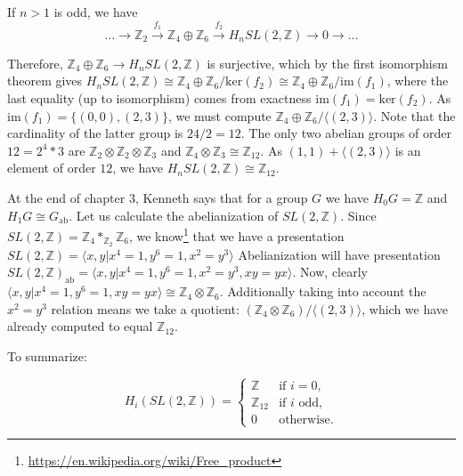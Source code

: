 \documentclass{article}
\begin{document}
\noindent
If $n>1$ is odd, we have
\begin{equation*}
\dots \to \mathbb{Z}_2 \xrightarrow{f_1} \mathbb{Z}_4 \oplus \mathbb{Z}_6 \xrightarrow{f_2} H_n SL(2,\mathbb{Z}) \to 0 \to \dots
\end{equation*}

Therefore, $\mathbb{Z}_4 \oplus \mathbb{Z}_6 \to H_n SL(2, \mathbb{Z})$ is surjective, which by the first isomorphism theorem gives 
$H_n SL(2, \mathbb{Z}) \cong \mathbb{Z}_4 \oplus \mathbb{Z}_6 / \mathrm{ker}(f_2) \cong \mathbb{Z}_4 \oplus \mathbb{Z}_6 / \mathrm{im}(f_1)$, where the last equality (up to isomorphism) comes from exactness $\mathrm{im}(f_1) = \mathrm{ker}(f_2)$.
As $\mathrm{im}(f_1) = \{(0,0),(2,3) \}$, we must compute  $\mathbb{Z}_4 \oplus \mathbb{Z}_6 / \langle (2,3) \rangle$. Note that the cardinality of the latter group is $24/2 = 12$. The only two abelian groups of order $12 = 2^4 * 3$ are $\mathbb{Z}_2 \otimes \mathbb{Z}_2 \otimes \mathbb{Z}_3$ and $\mathbb{Z}_4 \otimes \mathbb{Z}_3 \cong \mathbb{Z}_{12}$. As $(1,1)+\langle (2,3) \rangle$ is an element of order $12$, we have $H_n SL(2, \mathbb{Z}) \cong \mathbb{Z}_{12}$.

\noindent
At the end of chapter 3, Kenneth says that for a group $G$ we have $H_0 G = \mathbb{Z}$ and $H_1 G \cong G_\mathrm{ab}$.
Let us calculate the abelianization of $SL(2,\mathbb{Z})$.
Since $SL(2,\mathbb{Z}) = \mathbb{Z}_4 *_{\mathbb{Z}_2} \mathbb{Z}_6$, we know\footnote{\url{https://en.wikipedia.org/wiki/Free_product}} that we have a presentation $SL(2,\mathbb{Z}) = \langle x, y | x^4 = 1, y^6 = 1, x^2 = y^3 \rangle$
Abelianization will have presentation $SL(2,\mathbb{Z})_\mathrm{ab} = \langle x, y | x^4 = 1,  y^6=1, x^2 = y^3,  xy = yx \rangle$.
Now, clearly $\langle x, y | x^4 = 1, y^6 = 1, xy=yx \rangle \cong \mathbb{Z}_4 \otimes \mathbb{Z}_6$. Additionally taking into account the $x^2 = y^3$ relation means we take a quotient: $  (\mathbb{Z}_4 \otimes \mathbb{Z}_6) / \langle (2,3) \rangle$, which we have already computed to equal $\mathbb{Z}_{12}$.

To summarize:

\begin{equation*}
H_i(SL(2,\mathbb{Z})) =
\begin{cases}
    \mathbb{Z} & \text{if } i = 0, \\
    \mathbb{Z}_{12} & \text{if } i \text{ odd}, \\
    0 & \text{otherwise}.
\end{cases}
\end{equation*}
\end{document}
